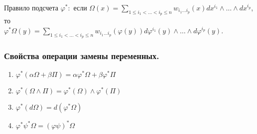 Правило подсчета $\varphi^*:$ если $\Omega(x)=\sum\limits_{1\leqslant i_1<\ldots<i_p\leqslant n}w_{i_1\ldots i_p}(x)dx^{i_1}\wedge\ldots\wedge dx^{i_p}$, то\\ 
$\varphi^*\Omega(y)=\sum\limits_{1\leqslant i_1<\ldots<i_p\leqslant n}w_{i_1\ldots i_p}(\varphi(y))d\varphi^{i_1}(y)\wedge\ldots\wedge d\varphi^{i_p}(y)$.
\subsubsection{Свойства операции замены переменных.}

\begin{enumerate}
	\item $\varphi^*(\alpha\Omega+\beta\Pi)=\alpha\varphi^*\Omega+\beta\varphi^*\Pi$
	\item
	$\varphi^*(\Omega\wedge\Pi)=\varphi^*(\Omega)\wedge\varphi^*(\Pi)$
	\item
	$\varphi^*(d\Omega)=d(\varphi^*\Omega)$
	\item 
	$\varphi^*\psi^*\Omega=(\varphi\psi)^*\Omega$
\end{enumerate}

